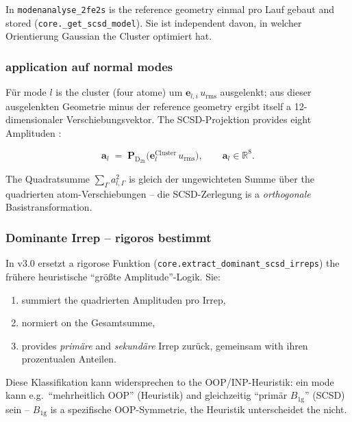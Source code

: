 \documentclass[11pt,a4paper,twoside]{article}
\newcommand{\evec}{\mathbf{e}}
\newcommand{\urms}{u_{\mathrm{rms}}}
\newcommand{\Bgi}[1]{B_{\mathrm{#1g}}}
\theoremstyle{remark}
\begin{document}
In \texttt{modenanalyse\_2fe2s} is the reference geometry einmal pro
Lauf gebaut and stored (\texttt{core.\_get\_scsd\_model}). Sie ist
independent davon, in welcher Orientierung Gaussian the Cluster
optimiert hat.

\subsubsection*{application auf normal modes}

F\"ur mode $l$ is the cluster (four atome) um $\evec_{l,i}\,\urms$
ausgelenkt; aus dieser ausgelenkten Geometrie minus der
reference geometry ergibt itself a 12-dimensionaler Verschiebungsvektor.
The SCSD-Projektion provides eight Amplituden \cite{Kingsbury2024}:

\begin{equation}
  \mathbf{a}_l \;=\;
  \mathbf{P}_{\mathrm{D}_{2\mathrm{h}}}\bigl(\evec_l^{\text{Cluster}} \,\urms\bigr) ,
  \qquad
  \mathbf{a}_l \in \mathbb{R}^8 .
  \label{eq:scsd-projection}
\end{equation}

The Quadratsumme $\sum_\Gamma a_{l,\Gamma}^2$ is gleich der
ungewichteten Summe \"uber the quadrierten atom-Verschiebungen --
die SCSD-Zerlegung is a \emph{orthogonale} Basistransformation.

\subsubsection*{Dominante Irrep -- rigoros bestimmt}
\label{sec:scsd-rigoros}

In v3.0 ersetzt a rigorose Funktion
(\texttt{core.extract\_dominant\_scsd\_irreps}) the fr\"uhere
heuristische "`gr\"o\ss te Amplitude"'-Logik. Sie:

\begin{enumerate}
  \item summiert the quadrierten Amplituden pro Irrep,
  \item normiert on the Gesamtsumme,
  \item provides \emph{prim\"are} and \emph{sekund\"are} Irrep zur\"uck,
        gemeinsam with ihren prozentualen Anteilen.
\end{enumerate}

Diese Klassifikation kann widersprechen to the OOP/INP-Heuristik: ein
mode kann e.g.\ "`mehrheitlich OOP"' (Heuristik) and gleichzeitig
"`prim\"ar $\Bgi{1}$"' (SCSD) sein -- $\Bgi{1}$ is a spezifische
OOP-Symmetrie, the Heuristik unterscheidet the nicht.
\end{document}
